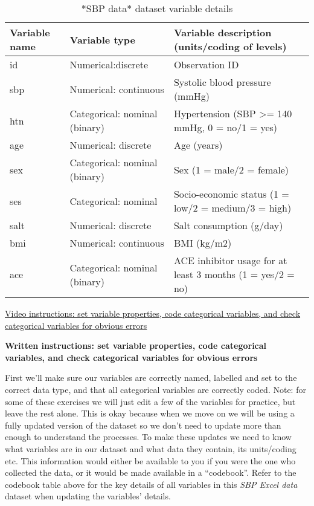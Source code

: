\documentclass[
]{book}
\begin{document}
\begin{table}

\caption{\label{tab:unnamed-chunk-3}*SBP data* dataset variable details}
\centering
\begin{tabular}[t]{l|l|l}
\hline
Variable name & Variable type & Variable description  (units/coding of levels)\\
\hline
id & Numerical:discrete & Observation ID\\
\hline
sbp & Numerical: continuous & Systolic blood pressure (mmHg)\\
\hline
htn & Categorical: nominal (binary) & Hypertension (SBP >= 140 mmHg, 0 = no/1 = yes)\\
\hline
age & Numerical: discrete & Age (years)\\
\hline
sex & Categorical: nominal (binary) & Sex (1 = male/2 = female)\\
\hline
ses & Categorical: nominal & Socio-economic status (1 = low/2 = medium/3 = high)\\
\hline
salt & Numerical: discrete & Salt consumption (g/day)\\
\hline
bmi & Numerical: continuous & BMI (kg/m2)\\
\hline
ace & Categorical: nominal (binary) & ACE inhibitor usage for at least 3 months (1 = yes/2 = no)\\
\hline
\end{tabular}
\end{table}

\href{https://youtu.be/ldFKC_qBFdA}{Video instructions: set variable properties, code categorical variables, and check categorical variables for obvious errors}

\textbf{Written instructions: set variable properties, code categorical variables, and check categorical variables for obvious errors}

First we'll make sure our variables are correctly named, labelled and set to the correct data type, and that all categorical variables are correctly coded. Note: for some of these exercises we will just edit a few of the variables for practice, but leave the rest alone. This is okay because when we move on we will be using a fully updated version of the dataset so we don't need to update more than enough to understand the processes. To make these updates we need to know what variables are in our dataset and what data they contain, its units/coding etc. This information would either be available to you if you were the one who collected the data, or it would be made available in a ``codebook''. Refer to the codebook table above for the key details of all variables in this \emph{SBP Excel data} dataset when updating the variables' details.
\end{document}
